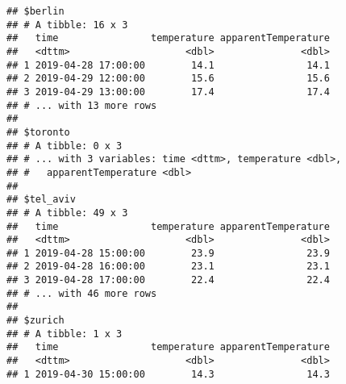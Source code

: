 \documentclass[]{book}
\newenvironment{Shaded}{\begin{snugshade}}{\end{snugshade}}
\newcommand{\ControlFlowTok}[1]{\textcolor[rgb]{0.13,0.29,0.53}{\textbf{#1}}}
\newcommand{\DecValTok}[1]{\textcolor[rgb]{0.00,0.00,0.81}{#1}}
\newcommand{\KeywordTok}[1]{\textcolor[rgb]{0.13,0.29,0.53}{\textbf{#1}}}
\newcommand{\NormalTok}[1]{#1}
\newcommand{\OperatorTok}[1]{\textcolor[rgb]{0.81,0.36,0.00}{\textbf{#1}}}
\newcommand{\StringTok}[1]{\textcolor[rgb]{0.31,0.60,0.02}{#1}}
\begin{document}
\begin{Shaded}
\end{Shaded}

\begin{verbatim}
## $berlin
## # A tibble: 16 x 3
##   time                temperature apparentTemperature
##   <dttm>                    <dbl>               <dbl>
## 1 2019-04-28 17:00:00        14.1                14.1
## 2 2019-04-29 12:00:00        15.6                15.6
## 3 2019-04-29 13:00:00        17.4                17.4
## # ... with 13 more rows
## 
## $toronto
## # A tibble: 0 x 3
## # ... with 3 variables: time <dttm>, temperature <dbl>,
## #   apparentTemperature <dbl>
## 
## $tel_aviv
## # A tibble: 49 x 3
##   time                temperature apparentTemperature
##   <dttm>                    <dbl>               <dbl>
## 1 2019-04-28 15:00:00        23.9                23.9
## 2 2019-04-28 16:00:00        23.1                23.1
## 3 2019-04-28 17:00:00        22.4                22.4
## # ... with 46 more rows
## 
## $zurich
## # A tibble: 1 x 3
##   time                temperature apparentTemperature
##   <dttm>                    <dbl>               <dbl>
## 1 2019-04-30 15:00:00        14.3                14.3
\end{verbatim}
\end{document}

